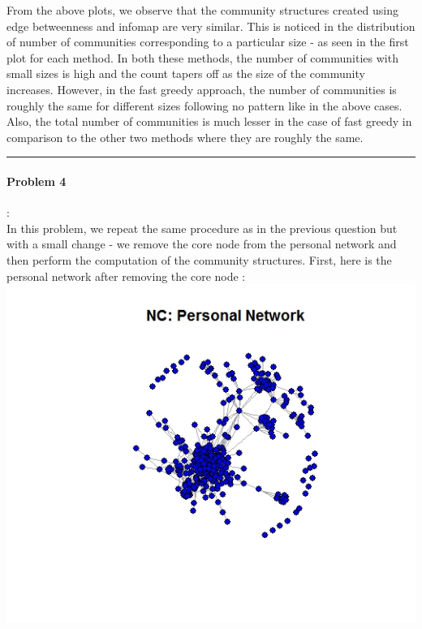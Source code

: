 \documentclass{article}
\begin{document}
From the above plots, we observe that the community structures created using edge betweenness and infomap are very similar. This is 
noticed in the distribution of number of communities corresponding to a particular size - as seen in the first plot for each method. In both these methods, the number
of communities with small sizes is high and the count tapers off as the size of the community increases. However, in the fast greedy approach,
the number of communities is roughly the same for different sizes following no pattern like in the above cases. Also, the total number of communities
is much lesser in the case of fast greedy in comparison to the other two methods where they are roughly the same.  \\

\hrule

\paragraph{Problem 4}:\\
In this problem, we repeat the same procedure as in the previous question but with a small change - 
we remove the core node from the personal network and then perform the computation of the community structures.
First, here is the personal network after removing the core node :\\
\includegraphics[scale=0.4]{q5b} \\
\end{document}
